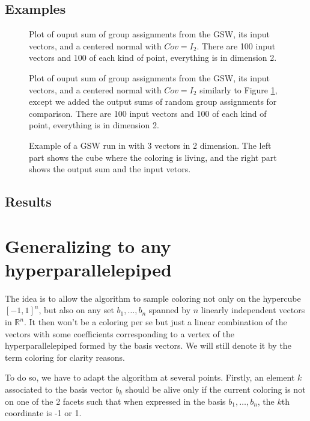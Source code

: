 \documentclass[12pt]{article}
\begin{document}
\subsection{Examples}
\begin{figure}[h]

\caption{Plot of ouput sum of group assignments from the GSW, its input vectors, and a centered normal with $Cov=I_2$. There are 100 input vectors and 100 of each kind of point, everything is in dimension 2.}
\label{4types_3}
\end{figure}
\begin{figure}[h]

\caption{Plot of ouput sum of group assignments from the GSW, its input vectors, and a centered normal with $Cov=I_2$ similarly to Figure \ref{4types_3}, except we added the output sums of random group assignments for comparison. There are 100 input vectors and 100 of each kind of point, everything is in dimension 2.}
\end{figure}
\begin{figure}
\newpage
{}
\caption{Example of a GSW run in with 3 vectors in 2 dimension. The left part shows the cube where the coloring is living, and the right part shows the output sum and the input vetors.}
\label{3d_example}
\end{figure}
\subsection{Results}
\section{Generalizing to any hyperparallelepiped}
The idea is to allow the algorithm to sample coloring not only on the hypercube $[-1,1]^n$, but also on any set $b_1,\dots, b_n$ spanned by $n$ linearly independent vectors in $\mathbb{R}^n$. It then won't be a coloring per se but just a linear combination of the vectors with some coefficients corresponding to a vertex of the hyperparallelepiped formed by the basis vectors. We will still denote it by the term coloring for clarity reasons.

To do so, we have to adapt the algorithm at several points. Firstly, an element $k$ associated to the basis vector $b_k$ should be alive only if the current coloring is not on one of the 2 facets such that when expressed in the basis $b_1,\dots,b_n$, the $k$th coordinate is -1 or 1. 
\end{document}
